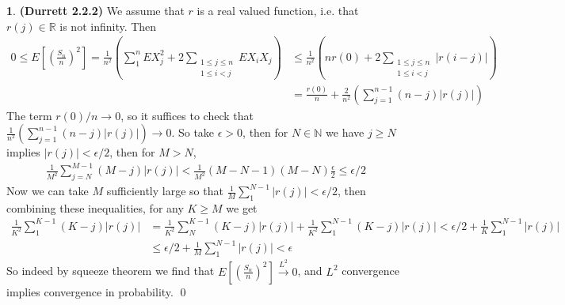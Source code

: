 \documentclass[10.5pt]{article}
\theoremstyle{definition}
\newtheorem{pb}{}
\newcommand{\abs}[1]{\lvert#1\rvert}
\begin{document}
    \begin{pb}\textbf{(Durrett 2.2.2)}
        We assume that \(r\) is a real valued function, i.e. that \(r(j) \in \mathbb{R}\) is not infinity. Then
        \begin{align*}
            0 \leq E\left[\left(\frac{S_n}{n}\right)^2\right] = \frac{1}{n^2}\left(\sum_1^n E X_j^2 + 2\sum_{\substack{1 \leq j \leq n \\ 1 \leq i < j}}EX_iX_j\right) &\leq \frac{1}{n^2}\left(nr(0) + 2\sum_{\substack{1 \leq j \leq n \\ 1 \leq i < j}}\abs{r(i-j)}\right) \\ &= \frac{r(0)}{n} + \frac{2}{n^2}\left(\sum_{j=1}^{n-1}(n-j)\abs{r(j)}\right)
        \end{align*}
        The term \(r(0)/n \to 0\), so it suffices to check that \(\frac{1}{n^2}\left(\sum_{j=1}^{n-1}(n-j)\abs{r(j)}\right) \to 0\). So take \(\epsilon > 0\), then for \(N \in \mathbb{N}\) we have \(j \geq N\) implies \(\abs{r(j)} < \epsilon/2\), then for \(M > N\),
        \begin{align*}
            \frac{1}{M^2}\sum_{j=N}^{M-1}(M-j)\abs{r(j)} < \frac{1}{M^2}(M-N-1)(M-N) \frac{\epsilon}{2} \leq \epsilon/2
        \end{align*}
        Now we can take \(M\) sufficiently large so that \(\frac{1}{M}\sum_1^{N-1}\abs{r(j)} < \epsilon/2\), then combining these inequalities, for any \(K \geq M\) we get
        \begin{align*}
            \frac{1}{K^2}\sum_1^{K-1}(K-j)\abs{r(j)} &= \frac{1}{K^2}\sum_N^{K-1}(K-j)\abs{r(j)} + \frac{1}{K^2}\sum_1^{N-1}(K-j)\abs{r(j)} < \epsilon/2 + \frac{1}{K}\sum_1^{N-1}\abs{r(j)} \\
            & \leq \epsilon/2 + \frac{1}{M}\sum_1^{N-1}\abs{r(j)} < \epsilon
        \end{align*}
        So indeed by squeeze theorem we find that \(E\left[\left(\frac{S_n}{n}\right)^2\right] \overset{L^2}{\to} 0\), and \(L^2\) convergence implies convergence in probability. \qed
    \end{pb}
\end{document}
